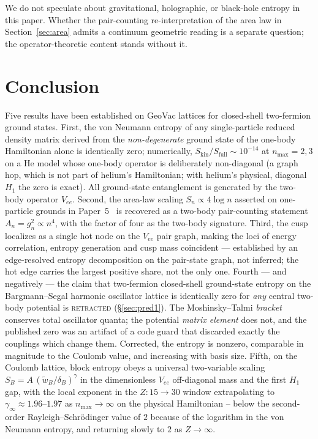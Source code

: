 \documentclass[twocolumn,pra,amsmath,amssymb,superscriptaddress]{revtex4-2}
\begin{document}
\medskip
We do not speculate about gravitational, holographic, or
black-hole entropy in this paper.  Whether the pair-counting
re-interpretation of the area law in Section~\ref{sec:area}
admits a continuum geometric reading is a separate question;
the operator-theoretic content stands without it.

\section{Conclusion}
\label{sec:conclusion}

Five results have been established on GeoVac lattices for
closed-shell two-fermion ground states.  First, the von
Neumann entropy of any single-particle reduced density matrix
derived from the \emph{non-degenerate} ground state of the
one-body Hamiltonian alone is identically zero; numerically,
$S_{\mathrm{kin}}/S_{\mathrm{full}}\sim 10^{-14}$ at $n_{\max}=2,3$ on
a He model whose one-body operator is deliberately non-diagonal (a
graph hop, which is not part of helium's Hamiltonian; with helium's
physical, diagonal $H_1$ the zero is exact).  All ground-state
entanglement is generated by
the two-body operator $V_{ee}$.  Second, the area-law scaling
$S_n \propto 4\log n$ asserted on one-particle grounds in
Paper~5~\cite{GeoVac_Paper5} is recovered as a two-body
pair-counting statement $A_n = g_n^{2}\propto n^{4}$, with the
factor of four as the two-body signature.  Third, the cusp
localizes as a single hot node on the $V_{ee}$ pair graph,
making the loci of energy correlation, entropy generation and cusp
mass coincident --- established by an edge-resolved entropy
decomposition on the pair-state graph, not inferred; the hot edge carries
the largest positive share, not the only one.  Fourth --- and negatively --- the
claim that two-fermion closed-shell ground-state entropy on the
Bargmann--Segal harmonic oscillator lattice is identically zero
for \emph{any} central two-body potential is \textsc{retracted}
(\S\ref{sec:pred1}).  The Moshinsky--Talmi \emph{bracket}
conserves total oscillator quanta; the potential \emph{matrix
element} does not, and the published zero was an artifact of a
code guard that discarded exactly the couplings which change
them.  Corrected, the entropy is nonzero, comparable in
magnitude to the Coulomb value, and increasing with basis
size.  Fifth, on the
Coulomb lattice, block entropy obeys a universal two-variable
scaling
$S_B = A\,(\tilde{w}_B/\delta_B)^{\gamma}$ in the dimensionless
$V_{ee}$ off-diagonal mass and the first $H_1$ gap, with the
local exponent in the $Z:15\to30$ window extrapolating to
$\gamma_{\infty} \approx 1.96$--$1.97$ as $n_{\max} \to \infty$ on the
physical Hamiltonian -- below the second-order Rayleigh--Schr\"odinger
value of $2$ because of the logarithm in the von Neumann entropy, and
returning slowly to $2$ as $Z\to\infty$.
\end{document}
